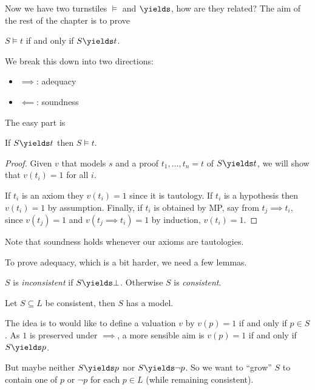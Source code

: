 \documentclass[a4paper]{article}
\begin{document}
Now we have two turnstiles \(\models\) and \(\yields\), how are they related? The aim of the rest of the chapter is to prove

\begin{theorem}
  \(S \models t\) if and only if \(S \yields t\).
\end{theorem}

We break this down into two directions:
\begin{itemize}
\item \(\implies\): adequacy
\item \(\impliedby\): soundness
\end{itemize}

The easy part is

\begin{proposition}[Soundness]
  If \(S \yields t\) then \(S \models t\).
\end{proposition}

\begin{proof}
  Given \(v\) that models \(s\) and a proof \(t_1, \dots, t_n = t\) of \(S \yields t\), we will show that \(v(t_i) = 1\) for all \(i\).

  If \(t_i\) is an axiom they \(v(t_i) = 1\) since it is tautology. If \(t_i\) is a hypothesis then \(v(t_i) = 1\) by assumption. Finally, if \(t_i\) is obtained by MP, say from \(t_j \implies t_i\), since \(v(t_j) = 1\) and \(v(t_j \implies t_i) = 1\) by induction, \(v(t_i) = 1\).
\end{proof}

Note that soundness holds whenever our axioms are tautologies.

To prove adequacy, which is a bit harder, we need a few lemmas.

\begin{definition}[Consistency]
  \(S\) is \emph{inconsistent} if \(S \yields \bot\). Otherwise \(S\) is \emph{consistent}.
\end{definition}

\begin{theorem}
  Let \(S \subseteq L\) be consistent, then \(S\) has a model.
\end{theorem}

The idea is to would like to define a valuation \(v\) by \(v(p) = 1\) if and only if \(p \in S\). As \(1\) is preserved under \(\implies\), a more sensible aim is \(v(p) = 1\) if and only if \(S \yields p\).

But maybe neither \(S \yields p\) nor \(S \yields \neg p\). So we want to ``grow'' \(S\) to contain one of \(p\) or \(\neg p\) for each \(p \in L\) (while remaining consistent).
\end{document}
